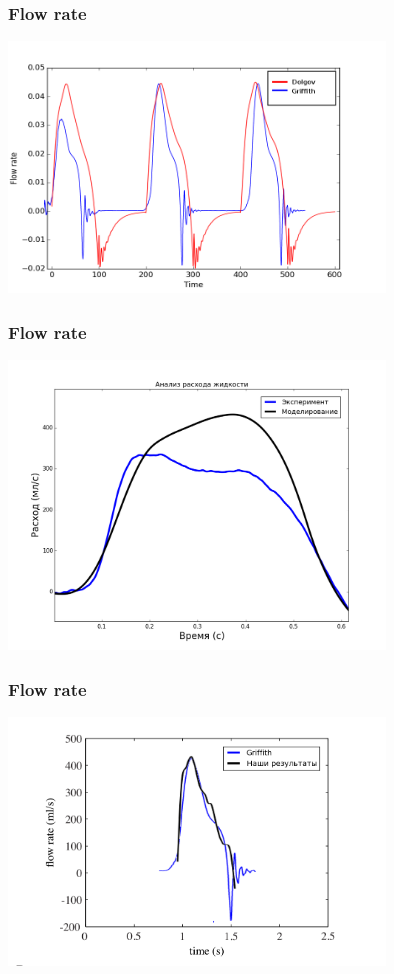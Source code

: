 \documentclass[14pt]{beamer}
\begin{document}
\begin{frame}
\frametitle{Flow rate}
    \begin{center}
        \includegraphics[width=10cm]{flow_rate_comparison_with_legend.png}
    \end{center}
\end{frame}

\begin{frame}
\frametitle{Flow rate}
    \begin{center}
        \includegraphics[width=10cm]{flowrate_experiment_with_legend.png}
    \end{center}
\end{frame}

\begin{frame}
\frametitle{Flow rate}
    \begin{center}
        \includegraphics[width=10cm]{flow_rate_griffith_comparison3.png}
    \end{center}
\end{frame}
\end{document}
